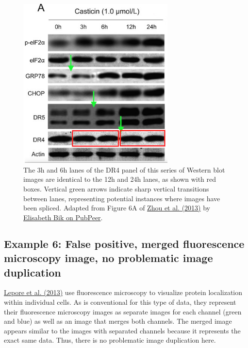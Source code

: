 \documentclass[letterpaper, 12pt]{article}
\begin{document}
\begin{figure}[h!tbp]
    \centering
    \includegraphics[width=0.7\textwidth]{img/image_duplication/image-1583362705327.jpg}
    \caption*{The 3h and 6h lanes of the DR4 panel of this series of Western blot images are identical to the 12h and 24h lanes, as shown with red boxes. Vertical green arrows indicate sharp vertical transitions between lanes, representing potential instances where images have been spliced. Adapted from Figure 6A of \href{https://doi.org/10.1371/journal.pone.0058855}{Zhou et al. (2013)} by \href{https://pubpeer.com/publications/2596C5A7287C83AFB4518CEF8AF7B4\#1}{Elisabeth Bik on PubPeer}.}
\end{figure}

\pagebreak

\subsection*{Example 6: False positive, merged fluorescence microscopy image, no problematic image duplication}

\href{https://doi.org/10.1371/journal.pone.0083018}{Lepore et al. (2013)} use fluorescence microscopy to visualize protein localization within individual cells. As is conventional for this type of data, they represent their fluorescence microscopy images as separate images for each channel (green and blue) as well as an image that merges both channels. The merged image appears similar to the images with separated channels because it represents the exact same data. Thus, there is no problematic image duplication here.
\end{document}
